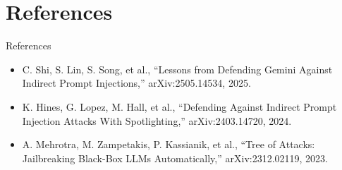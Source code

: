 \documentclass{beamer}
\begin{document}
\section{References}
\begin{frame}{References}
\footnotesize
\begin{itemize}
\item C. Shi, S. Lin, S. Song, et al., ``Lessons from Defending Gemini Against Indirect Prompt Injections,'' arXiv:2505.14534, 2025.
\item K. Hines, G. Lopez, M. Hall, et al., ``Defending Against Indirect Prompt Injection Attacks With Spotlighting,'' arXiv:2403.14720, 2024.
\item A. Mehrotra, M. Zampetakis, P. Kassianik, et al., ``Tree of Attacks: Jailbreaking Black-Box LLMs Automatically,'' arXiv:2312.02119, 2023.
\end{itemize}
\end{frame}
\begin{frame}\vfill{}\vfill\end{frame}
\end{document}
